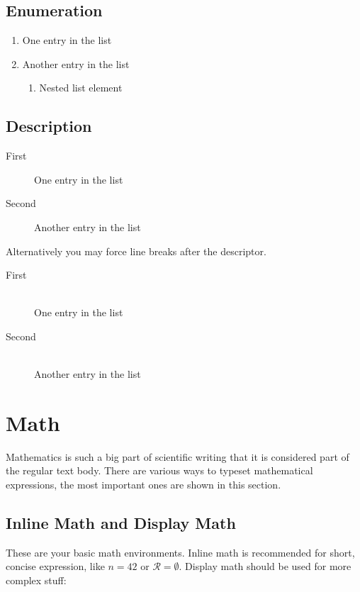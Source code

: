 \subsection{Enumeration}

\begin{enumerate}
	\item One entry in the list
	\item Another entry in the list
	      \begin{enumerate}
		      \item Nested list element
	      \end{enumerate}
\end{enumerate}

\subsection{Description}

\begin{description}
	\item[First] One entry in the list
	\item[Second] Another entry in the list
\end{description}

Alternatively you may force line breaks after the descriptor.

\begin{description}
	\item[First]\hfill\\
	      One entry in the list
	\item[Second]\hfill\\
	      Another entry in the list
\end{description}

\section{Math}

Mathematics is such a big part of scientific writing that it is considered part of the regular text body.
There are various ways to typeset mathematical expressions, the most important ones are shown in this section.

\subsection{Inline Math and Display Math}

These are your basic math environments.
Inline math is recommended for short, concise expression, like $n = 42$ or $\mathcal{R} = \emptyset$.
Display math should be used for more complex stuff:

